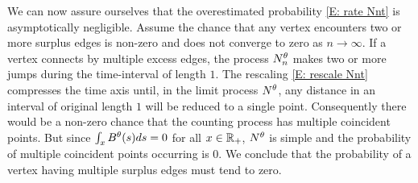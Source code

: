 We can now assure ourselves that the overestimated probability \eqref{E: rate Nnt} is asymptotically negligible.
Assume the chance that any vertex encounters two or more surplus edges is non-zero and does not converge to zero as $n \rightarrow \infty$.
If a vertex connects by multiple excess edges, the process $N_n^{\theta}$ makes two or more jumps during the time-interval of length $1$.
The rescaling \eqref{E: rescale Nnt} compresses the time axis until, in the limit process $N^{\theta}$, 
any distance in an interval of original length $1$ will be reduced to a single point.
Consequently there would be a non-zero chance that the counting process has multiple coincident points.
But since $\int_x B^{\theta}(s)ds = 0$ for all $x \in \mathbb{R}_+$, 
$N^{\theta}$ is simple and the probability of multiple coincident points occurring is $0$.
We conclude that the probability of a vertex having multiple surplus edges must tend to zero.


